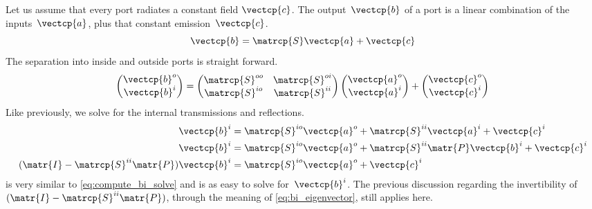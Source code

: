 \begin{refsection}
Let us assume that every port radiates a constant field $\vectcp{c}$.
The output~$\vectcp{b}$ of a port is a linear combination of the inputs~$\vectcp{a}$, plus that constant emission~$\vectcp{c}$.
\begin{equation}
    \vectcp{b} = \matrcp{S} \vectcp{a} + \vectcp{c}
    \label{eq:internal_sources}
\end{equation}
The separation into inside and outside ports is straight forward.
\begin{equation}
    \begin{pmatrix}
        \vectcp{b}^o\\
        \vectcp{b}^i\\
    \end{pmatrix}
    =
    \begin{pmatrix}
        \matrcp{S}^{oo} & \matrcp{S}^{oi} \\
        \matrcp{S}^{io} & \matrcp{S}^{ii}
    \end{pmatrix}
    \begin{pmatrix}
        \vectcp{a}^o\\
        \vectcp{a}^i\\
    \end{pmatrix}
    +
    \begin{pmatrix}
        \vectcp{c}^o\\
        \vectcp{c}^i\\
    \end{pmatrix}
    \label{eq:internal_sources_io}
\end{equation}
Like previously, we solve for the internal transmissions and reflections.
\begin{subequations}
    \label{eq:compute_bi_ci}
    \begin{align}
        \vectcp{b}^i &= \matrcp{S}^{io} \vectcp{a}^o + \matrcp{S}^{ii} \vectcp{a}^i + \vectcp{c}^i \label{eq:compute_bi_ai_ci}\\
        \vectcp{b}^i &= \matrcp{S}^{io} \vectcp{a}^o + \matrcp{S}^{ii} \matr{P} \vectcp{b}^i + \vectcp{c}^i \label{eq:compute_bi_bi_ci}\\
        (\matr{I} - \matrcp{S}^{ii} \matr{P}) \vectcp{b}^i &= \matrcp{S}^{io} \vectcp{a}^o + \vectcp{c}^i \label{eq:compute_bi_ci_solve}
    \end{align}
\end{subequations}
 is very similar to \cref{eq:compute_bi_solve} and is as easy to solve for~$\vectcp{b}^i$.
The previous discussion regarding the invertibility of $(\matr{I} - \matrcp{S}^{ii} \matr{P})$, through the meaning of \cref{eq:bi_eigenvector}, still applies here.


\end{refsection}

